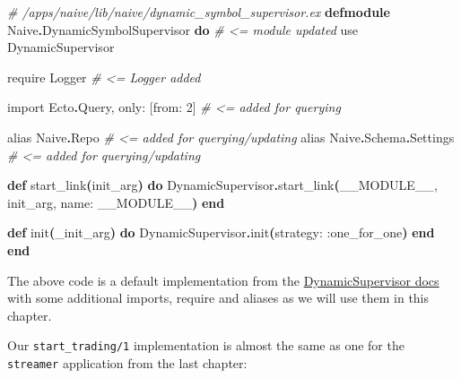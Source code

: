 \documentclass[
  oneside]{book}
\newenvironment{Shaded}{\begin{snugshade}}{\end{snugshade}}
\newcommand{\CommentTok}[1]{\textcolor[rgb]{0.56,0.35,0.01}{\textit{#1}}}
\newcommand{\ConstantTok}[1]{\textcolor[rgb]{0.56,0.35,0.01}{#1}}
\newcommand{\DecValTok}[1]{\textcolor[rgb]{0.00,0.00,0.81}{#1}}
\newcommand{\FunctionTok}[1]{\textcolor[rgb]{0.13,0.29,0.53}{\textbf{#1}}}
\newcommand{\ImportTok}[1]{#1}
\newcommand{\KeywordTok}[1]{\textcolor[rgb]{0.13,0.29,0.53}{\textbf{#1}}}
\newcommand{\NormalTok}[1]{#1}
\newcommand{\OperatorTok}[1]{\textcolor[rgb]{0.81,0.36,0.00}{\textbf{#1}}}
\newcommand{\OtherTok}[1]{\textcolor[rgb]{0.56,0.35,0.01}{#1}}
\newcommand{\VariableTok}[1]{\textcolor[rgb]{0.00,0.00,0.00}{#1}}
\begin{document}
\begin{Shaded}
\begin{Highlighting}[]
\CommentTok{\# /apps/naive/lib/naive/dynamic\_symbol\_supervisor.ex}
\KeywordTok{defmodule} \ConstantTok{Naive}\OperatorTok{.}\ConstantTok{DynamicSymbolSupervisor} \KeywordTok{do} \CommentTok{\# \textless{}= module updated}
  \ImportTok{use} \ConstantTok{DynamicSupervisor}

  \ImportTok{require} \ConstantTok{Logger} \CommentTok{\# \textless{}= Logger added}

  \ImportTok{import} \ConstantTok{Ecto}\OperatorTok{.}\ConstantTok{Query}\NormalTok{, }\VariableTok{only:} \OtherTok{[}\VariableTok{from:} \DecValTok{2}\OtherTok{]} \CommentTok{\# \textless{}= added for querying}

  \ImportTok{alias} \ConstantTok{Naive}\OperatorTok{.}\ConstantTok{Repo}             \CommentTok{\# \textless{}= added for querying/updating}
  \ImportTok{alias} \ConstantTok{Naive}\OperatorTok{.}\ConstantTok{Schema}\OperatorTok{.}\ConstantTok{Settings}  \CommentTok{\# \textless{}= added for querying/updating}

  \KeywordTok{def}\NormalTok{ start\_link}\FunctionTok{(}\NormalTok{init\_arg}\FunctionTok{)} \KeywordTok{do}
    \ConstantTok{DynamicSupervisor}\OperatorTok{.}\NormalTok{start\_link}\FunctionTok{(}\ConstantTok{\_\_MODULE\_\_}\NormalTok{, init\_arg, }\VariableTok{name:} \ConstantTok{\_\_MODULE\_\_}\FunctionTok{)}
  \KeywordTok{end}

  \KeywordTok{def}\NormalTok{ init}\FunctionTok{(}\NormalTok{\_init\_arg}\FunctionTok{)} \KeywordTok{do}
    \ConstantTok{DynamicSupervisor}\OperatorTok{.}\NormalTok{init}\FunctionTok{(}\VariableTok{strategy:} \VariableTok{:one\_for\_one}\FunctionTok{)}
  \KeywordTok{end}
\KeywordTok{end}
\end{Highlighting}
\end{Shaded}

The above code is a default implementation from the \href{https://hexdocs.pm/elixir/master/DynamicSupervisor.html\#module-module-based-supervisors}{DynamicSupervisor docs} with some additional imports, require and aliases as we will use them in this chapter.

Our \texttt{start\_trading/1} implementation is almost the same as one for the \texttt{streamer} application from the last chapter:
\end{document}
